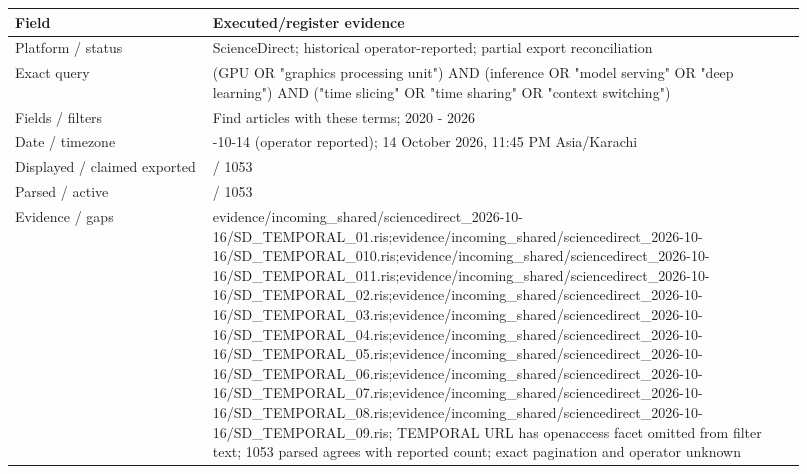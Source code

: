 \documentclass[12pt,a4paper]{article}
\begin{document}
{\small\begin{longtable}{>{\raggedright\arraybackslash}p{0.23\linewidth}>{\raggedright\arraybackslash}p{0.69\linewidth}}
\toprule
Field & Executed/\allowbreak{}register evidence\\\midrule
\endhead
Platform /\allowbreak{} status & ScienceDirect; historical operator-reported; partial export reconciliation\\
Exact query & (GPU OR "graphics processing unit") AND (inference OR "model serving" OR "deep learning") AND ("time slicing" OR "time sharing" OR "context switching")\\
Fields /\allowbreak{} filters & Find articles with these terms; 2020 - 2026\\
Date /\allowbreak{} timezone & 2026-10-14 (operator reported); 14 October 2026, 11:\allowbreak{}45 PM Asia/\allowbreak{}Karachi\\
Displayed /\allowbreak{} claimed exported & 1053 /\allowbreak{} 1053\\
Parsed /\allowbreak{} active & 1053 /\allowbreak{} 1053\\
Evidence /\allowbreak{} gaps & evidence/\allowbreak{}incoming\_\allowbreak{}shared/\allowbreak{}sciencedirect\_\allowbreak{}2026-10-16/\allowbreak{}SD\_\allowbreak{}TEMPORAL\_\allowbreak{}01.ris;evidence/\allowbreak{}incoming\_\allowbreak{}shared/\allowbreak{}sciencedirect\_\allowbreak{}2026-10-16/\allowbreak{}SD\_\allowbreak{}TEMPORAL\_\allowbreak{}010.ris;evidence/\allowbreak{}incoming\_\allowbreak{}shared/\allowbreak{}sciencedirect\_\allowbreak{}2026-10-16/\allowbreak{}SD\_\allowbreak{}TEMPORAL\_\allowbreak{}011.ris;evidence/\allowbreak{}incoming\_\allowbreak{}shared/\allowbreak{}sciencedirect\_\allowbreak{}2026-10-16/\allowbreak{}SD\_\allowbreak{}TEMPORAL\_\allowbreak{}02.ris;evidence/\allowbreak{}incoming\_\allowbreak{}shared/\allowbreak{}sciencedirect\_\allowbreak{}2026-10-16/\allowbreak{}SD\_\allowbreak{}TEMPORAL\_\allowbreak{}03.ris;evidence/\allowbreak{}incoming\_\allowbreak{}shared/\allowbreak{}sciencedirect\_\allowbreak{}2026-10-16/\allowbreak{}SD\_\allowbreak{}TEMPORAL\_\allowbreak{}04.ris;evidence/\allowbreak{}incoming\_\allowbreak{}shared/\allowbreak{}sciencedirect\_\allowbreak{}2026-10-16/\allowbreak{}SD\_\allowbreak{}TEMPORAL\_\allowbreak{}05.ris;evidence/\allowbreak{}incoming\_\allowbreak{}shared/\allowbreak{}sciencedirect\_\allowbreak{}2026-10-16/\allowbreak{}SD\_\allowbreak{}TEMPORAL\_\allowbreak{}06.ris;evidence/\allowbreak{}incoming\_\allowbreak{}shared/\allowbreak{}sciencedirect\_\allowbreak{}2026-10-16/\allowbreak{}SD\_\allowbreak{}TEMPORAL\_\allowbreak{}07.ris;evidence/\allowbreak{}incoming\_\allowbreak{}shared/\allowbreak{}sciencedirect\_\allowbreak{}2026-10-16/\allowbreak{}SD\_\allowbreak{}TEMPORAL\_\allowbreak{}08.ris;evidence/\allowbreak{}incoming\_\allowbreak{}shared/\allowbreak{}sciencedirect\_\allowbreak{}2026-10-16/\allowbreak{}SD\_\allowbreak{}TEMPORAL\_\allowbreak{}09.ris; TEMPORAL URL has openaccess facet omitted from filter text; 1053 parsed agrees with reported count; exact pagination and operator unknown\\
\bottomrule
\end{longtable}}
\end{document}
